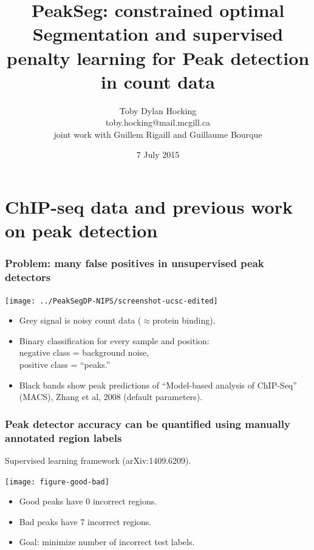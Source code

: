 \documentclass{beamer}
\begin{document}
\title{PeakSeg: constrained optimal \textbf{Seg}mentation and
  supervised penalty learning for \textbf{Peak} detection in count data}

\author{
  Toby Dylan Hocking\\
  toby.hocking@mail.mcgill.ca\\
  joint work with Guillem Rigaill and Guillaume Bourque}

\date{7 July 2015}

\maketitle

\section{ChIP-seq data and previous work on peak detection}


\begin{frame}
  \frametitle{Problem: many false
    positives in unsupervised peak detectors}

  \texttt{[image: ../PeakSegDP-NIPS/screenshot-ucsc-edited]}

  \begin{itemize}
    \item Grey signal is noisy count data ($\approx$protein binding).
    \item Binary classification for every sample and position: \\
      negative class = background noise,\\
      positive class = ``peaks.''
    \item Black bands show peak predictions of ``Model-based analysis of
      ChIP-Seq'' (MACS), Zhang et al, 2008 (default parameters).
  \end{itemize}
\end{frame}

\begin{frame}
  \frametitle{Peak detector accuracy can be quantified using manually
    annotated region labels}

  Supervised learning framework (arXiv:1409.6209).
  
  \texttt{[image: figure-good-bad]}

  \begin{itemize}
  \item Good peaks have 0 incorrect regions.
  \item Bad peaks have 7 incorrect regions.
  \item Goal: minimize number of incorrect test labels.
  \end{itemize}

\end{frame}
\end{document}
